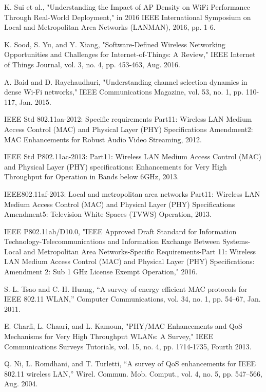 \begin{thebibliography}{1}
 K. Sui et al., "Understanding the Impact of AP Density on WiFi Performance Through Real-World Deployment," in 2016 IEEE International Symposium on Local and Metropolitan Area Networks (LANMAN), 2016, pp. 1-6.

 K. Sood, S. Yu, and Y. Xiang, "Software-Defined Wireless Networking Opportunities and Challenges for Internet-of-Things: A Review," IEEE Internet of Things Journal, vol. 3, no. 4, pp. 453-463, Aug. 2016.


 A. Baid and D. Raychaudhuri, "Understanding channel selection dynamics in dense Wi-Fi networks," IEEE Communications Magazine, vol. 53, no. 1, pp. 110-117, Jan. 2015.

 IEEE Std 802.11aa-2012: Specific requirements Part11: Wireless LAN Medium Access Control (MAC) and Physical Layer (PHY) Specifications Amendment2: MAC Enhancements for Robust Audio Video Streaming, 2012.

 IEEE Std P802.11ac-2013: Part11: Wireless LAN Medium Access Control (MAC) and Physical Layer (PHY) specifications: Enhancements for Very High Throughput for Operation in Bands below 6GHz, 2013.

 IEEE802.11af-2013: Local and metropolitan area networks Part11: Wireless LAN Medium Access Control (MAC) and Physical Layer (PHY) Specifications Amendment5: Television White Spaces (TVWS) Operation, 2013.

 IEEE P802.11ah/D10.0, "IEEE Approved Draft Standard for Information Technology-Telecommunications and Information Exchange Between Systems-Local and Metropolitan Area Networks-Specific Requirements-Part 11: Wireless LAN Medium Access Control (MAC) and Physical Layer (PHY) Specifications: Amendment 2: Sub 1 GHz License Exempt Operation," 2016.

 S.-L. Tsao and C.-H. Huang, “A survey of energy efficient MAC protocols for IEEE 802.11 WLAN,” Computer Communications, vol. 34, no. 1, pp. 54–67, Jan. 2011.

 E. Charfi, L. Chaari, and L. Kamoun, "PHY/MAC Enhancements and QoS Mechanisms for Very High Throughput WLANs: A Survey," IEEE Communications Surveys Tutorials, vol. 15, no. 4, pp. 1714-1735, Fourth 2013.

 Q. Ni, L. Romdhani, and T. Turletti, “A survey of QoS enhancements for IEEE 802.11 wireless LAN,” Wirel. Commun. Mob. Comput., vol. 4, no. 5, pp. 547–566, Aug. 2004.


\end{thebibliography}
